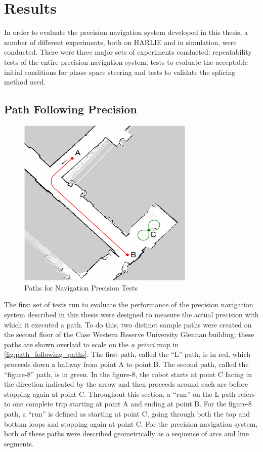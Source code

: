 \section{Results}\label{sec:results}

In order to evaluate the precision navigation system developed in this thesis, a number of different experiments, both on HARLIE and in simulation, were conducted. There were three major sets of experiments conducted: repeatability tests of the entire precision navigation system, tests to evaluate the acceptable initial conditions for phase space steering and tests to validate the splicing method used.

\subsection{Path Following Precision}\label{subsec:path_following_precision}

\begin{figure}
\centering
\includegraphics[width=0.75\textwidth]{images/path_following_paths}
\caption{Paths for Navigation Precision Tests \label{fig:path_following_paths}}
\end{figure}

The first set of tests run to evaluate the performance of the precision navigation system described in this thesis were designed to measure the actual precision with which it executed a path. To do this, two distinct sample paths were created on the second floor of the Case Western Reserve University Glennan building; these paths are shown overlaid to scale on the \emph{a priori} map in \autoref{fig:path_following_paths}. The first path, called the ``L'' path, is in red, which proceeds down a hallway from point A to point B. The second path, called the ``figure-8'' path, is in green. In the figure-8, the robot starts at point C facing in the direction indicated by the arrow and then proceeds around each arc before stopping again at point C. Throughout this section, a ``run'' on the L path refers to one complete trip starting at point A and ending at point B. For the figure-8 path, a ``run'' is defined as starting at point C, going through both the top and bottom loops and stopping again at point C. For the precision navigation system, both of these paths were described geometrically as a sequence of arcs and line segments.

